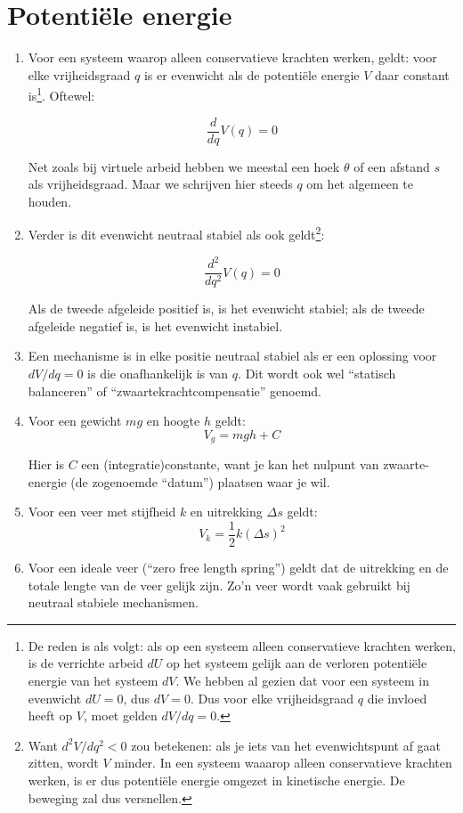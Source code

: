 \documentclass{article}
\begin{document}
\section{Potenti\"ele energie}
\begin{enumerate}
    \item Voor een systeem waarop alleen conservatieve krachten werken, geldt: voor elke vrijheidsgraad $q$ is er evenwicht als de potenti\"ele energie $V$ daar constant is\footnote{De reden is als volgt: als op een systeem alleen conservatieve krachten werken, is de verrichte arbeid $dU$ op het systeem gelijk aan de verloren potentiële energie van het systeem $dV$. We hebben al gezien dat voor een systeem in evenwicht $dU=0$, dus $dV=0$. Dus voor elke vrijheidsgraad $q$ die invloed heeft op $V$, moet gelden $dV/dq=0$.}. Oftewel:

$$\frac{d}{dq}V(q) = 0$$

Net zoals bij virtuele arbeid hebben we meestal een hoek $\theta$ of een afstand $s$ als vrijheidsgraad. Maar we schrijven hier steeds $q$ om het algemeen te houden.

\item Verder is dit evenwicht neutraal stabiel als ook geldt\footnote{Want $d^2V/dq^2<0$ zou betekenen: als je iets van het evenwichtspunt af gaat zitten, wordt $V$ minder. In een systeem waaarop alleen conservatieve krachten werken, is er dus potentiële energie omgezet in kinetische energie. De beweging zal dus versnellen.}:

$$\frac{d^2}{dq^2}V(q) = 0$$

Als de tweede afgeleide positief is, is het evenwicht stabiel; als de tweede afgeleide negatief is, is het evenwicht instabiel.

\item Een mechanisme is in elke positie neutraal stabiel als er een oplossing voor $dV/dq=0$ is die onafhankelijk is van $q$. Dit wordt ook wel ``statisch balanceren'' of ``zwaartekrachtcompensatie'' genoemd.

\item Voor een gewicht $mg$ en hoogte $h$ geldt:
$$V_g = mgh + C$$

Hier is $C$ een (integratie)constante, want je kan het nulpunt van zwaarte-energie (de zogenoemde ``datum'') plaatsen waar je wil. 

\item Voor een veer met stijfheid $k$ en uitrekking $\Delta s$ geldt:
$$V_k = \frac{1}{2}k(\Delta s)^2$$

\item Voor een ideale veer (``zero free length spring'') geldt dat de uitrekking en de totale lengte van de veer gelijk zijn. Zo'n veer wordt vaak gebruikt bij neutraal stabiele mechanismen.


\end{enumerate}
\end{document}
